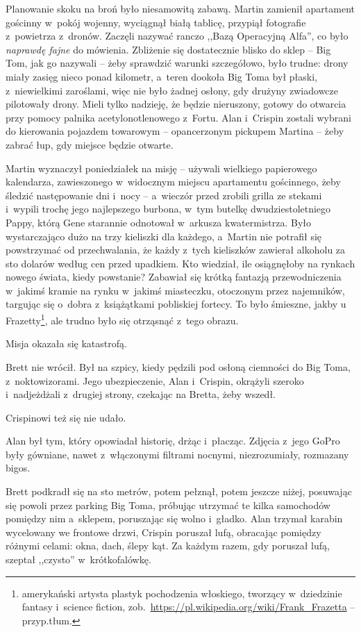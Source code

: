 \documentclass[oneside,polish,11pt,sfheadings]{mwbk}
\begin{document}
Planowanie skoku na broń było niesamowitą zabawą. Martin zamienił
apartament gościnny w~pokój wojenny, wyciągnął białą tablicę, przypiął
fotografie z~powietrza z~dronów. Zaczęli nazywać ranczo ,,Bazą
Operacyjną Alfa'', co było \textit{naprawdę fajne} do mówienia. Zbliżenie
się dostatecznie blisko do sklep -- Big Tom, jak go nazywali -- żeby
sprawdzić warunki szczegółowo, było trudne: drony miały zasięg nieco
ponad kilometr, a~teren dookoła Big Toma był płaski, z~niewielkimi
zaroślami, więc nie było żadnej osłony, gdy drużyny zwiadowcze
pilotowały drony. Mieli tylko nadzieję, że będzie nieruszony, gotowy do
otwarcia przy pomocy palnika acetylonotlenowego z~Fortu. Alan i~Crispin
zostali wybrani do kierowania pojazdem towarowym -- opancerzonym pickupem
Martina -- żeby zabrać łup, gdy miejsce będzie otwarte.

Martin wyznaczył poniedziałek na misję -- używali wielkiego papierowego
kalendarza, zawieszonego w~widocznym miejscu apartamentu gościnnego,
żeby śledzić następowanie dni i~nocy -- a~wieczór przed zrobili grilla ze
stekami i~wypili trochę jego najlepszego burbona, w~tym butelkę
dwudziestoletniego Pappy, którą Gene starannie odnotował w~arkusza
kwatermistrza. Było wystarczająco dużo na trzy kieliszki dla każdego, a~Martin nie potrafił się powstrzymać od przechwalania, że każdy z~tych
kieliszków zawierał alkoholu za sto dolarów według cen przed upadkiem.
Kto wiedział, ile osiągnęłoby na rynkach nowego świata, kiedy powstanie?
Zabawiał się krótką fantazją przewodniczenia w~jakimś kramie na rynku w~jakimś miasteczku, otoczonym przez najemników, targując się o~dobra z~książątkami pobliskiej fortecy. To było śmieszne, jakby u Frazetty\footnote{
amerykański artysta plastyk pochodzenia włoskiego, tworzący w~dziedzinie
fantasy i~science fiction,
zob.~\url{https://pl.wikipedia.org/wiki/Frank\_Frazetta} -- przyp.tłum.}, ale trudno było się otrząsnąć z~tego obrazu.


Misja okazała się katastrofą.

Brett nie wrócił. Był na szpicy, kiedy pędzili pod osłoną ciemności do
Big Toma, z~noktowizorami. Jego ubezpieczenie, Alan i~Crispin, okrążyli
szeroko i~nadjeżdżali z~drugiej strony, czekając na Bretta, żeby wszedł.

Crispinowi też się nie udało.

Alan był tym, który opowiadał historię, drżąc i~płacząc. Zdjęcia z~jego
GoPro były gówniane, nawet z~włączonymi filtrami nocnymi, niezrozumiały,
rozmazany bigos.

Brett podkradł się na sto metrów, potem pełznął, potem jeszcze niżej,
posuwając się powoli przez parking Big Toma, próbując utrzymać te kilka
samochodów pomiędzy nim a~sklepem, poruszając się wolno i~gładko. Alan
trzymał karabin wycelowany we frontowe drzwi, Crispin poruszał lufą,
obracając pomiędzy różnymi celami: okna, dach, ślepy kąt. Za każdym
razem, gdy poruszał lufą, szeptał ,,czysto'' w~krótkofalówkę.
\end{document}

